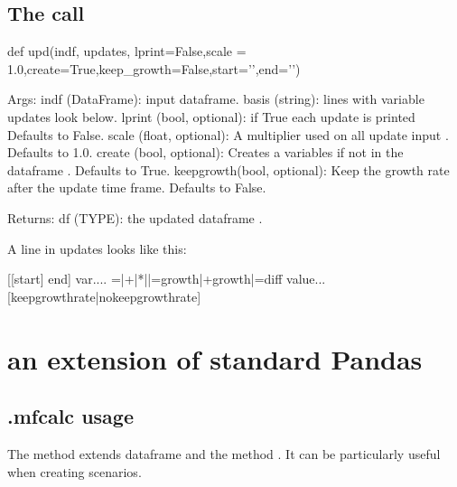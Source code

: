 \documentclass[letterpaper,10pt,english]{jupyterBook}
\begin{document}
\section{The call}
\label{\detokenize{content/04_PythonEssentials/UpdateCommand:the-call}}
\sphinxAtStartPar
def upd(indf, updates, lprint=False,scale = 1.0,create=True,keep\_growth=False,start=’’,end=’’)

\begin{sphinxVerbatim}[commandchars=\\\{\}]
Args:
        indf (DataFrame): input dataframe.
        basis (string): lines with variable updates look below.
        lprint (bool, optional): if True each update is printed  Defaults to False.
        scale (float, optional): A multiplier used on all update input . Defaults to 1.0.
        create (bool, optional): Creates a variables if not in the dataframe . Defaults to True.
        keep\PYGZus{}growth(bool, optional): Keep the growth rate after the update time frame. Defaults to False.

    Returns:
        df (TYPE): the updated dataframe .
        
    A line in updates looks like this:     
           
    \PYGZdq{}\PYGZlt{}\PYGZdq{}[[start] end]\PYGZdq{}\PYGZgt{}\PYGZdq{} \PYGZlt{}var....\PYGZgt{} \PYGZlt{}=|+|*|\PYGZpc{}|=growth|+growth|=diff\PYGZgt{} \PYGZlt{}value\PYGZgt{}...  [\PYGZhy{}\PYGZhy{}keep\PYGZus{}growth\PYGZus{}rate|\PYGZhy{}\PYGZhy{}no\PYGZus{}keep\PYGZus{}growth\PYGZus{}rate]
\end{sphinxVerbatim}

\sphinxstepscope


\chapter{ an extension of standard Pandas}
\label{\detokenize{content/04_PythonEssentials/ExtendingDataFrames:mfcalc-an-extension-of-standard-pandas}}\label{\detokenize{content/04_PythonEssentials/ExtendingDataFrames::doc}}

\section{.mfcalc usage}
\label{\detokenize{content/04_PythonEssentials/ExtendingDataFrames:mfcalc-usage}}
\sphinxAtStartPar
The  method extends dataframe and the method .  It can be particularly useful when creating scenarios.
\end{document}
